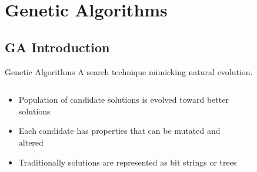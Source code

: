 \documentclass[compress]{beamer}
\begin{document}
\section{Genetic Algorithms}
\subsection{GA Introduction}
\begin{frame}{Genetic Algorithms}
A search technique mimicking natural evolution.
\begin{columns}[onlytextwidth]
  \begin{column}{0.45\textwidth}
    \small
    \begin{itemize}
      \item Population of candidate solutions is evolved toward better solutions
      \item Each candidate has properties that can be mutated and altered
      \item Traditionally solutions are represented as bit strings or trees
    \end{itemize}
    \end{column}
  \begin{column}{0.45\textwidth}
    \begin{figure}
		\tiny
		\begin{algorithmic}
        \ENDFOR
        \ENDFOR
      \ENDWHILE
    \end{algorithmic}
    \end{figure}
  \end{column}
\end{columns}
\end{frame}
\end{document}
